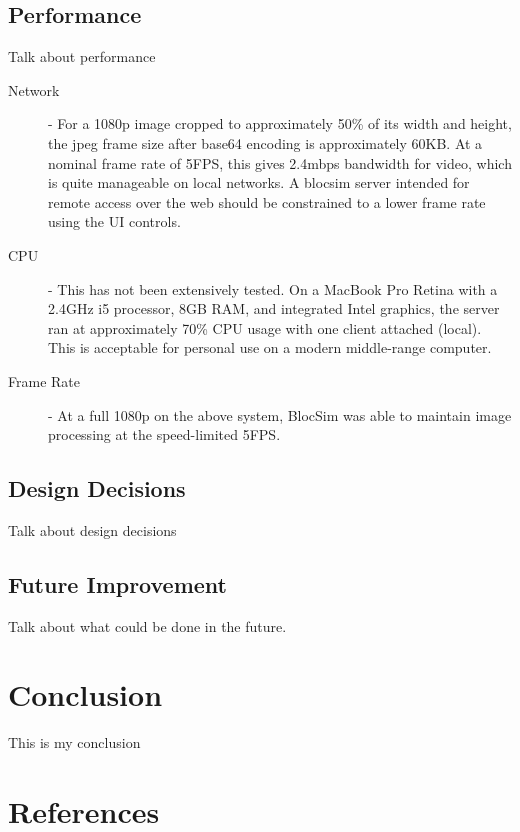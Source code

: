 \documentclass[titlesmallcaps, examinerscopy, copyrightpage]{uqthesis}
\begin{document}
\section{Performance}

Talk about performance

\begin{description}
	\item[Network] - For a 1080p image cropped to approximately 50\% of its width and height, the jpeg frame size after base64 encoding is approximately 60KB. At a nominal frame rate of 5FPS, this gives 2.4mbps bandwidth for video, which is quite manageable on local networks. A blocsim server intended for remote access over the web should be constrained to a lower frame rate using the UI controls.
	\item[CPU] - This has not been extensively tested. On a MacBook Pro Retina with a 2.4GHz i5 processor, 8GB RAM, and integrated Intel graphics, the server ran at approximately 70\% CPU usage with one client attached (local). This is acceptable for personal use on a modern middle-range computer. 
	\item[Frame Rate] - At a full 1080p on the above system, BlocSim was able to maintain image processing at the speed-limited 5FPS.
\end{description}


\section{Design Decisions}
\label{ch:review:design}

Talk about design decisions

\section{Future Improvement}

Talk about what could be done in the future.

\chapter{Conclusion}

 This is my conclusion




























\chapter*{References}
\begingroup
{}
\renewcommand{\addcontentsline}[3]{}
\renewcommand{\chapter}[2]{}

\endgroup


\end{document}
